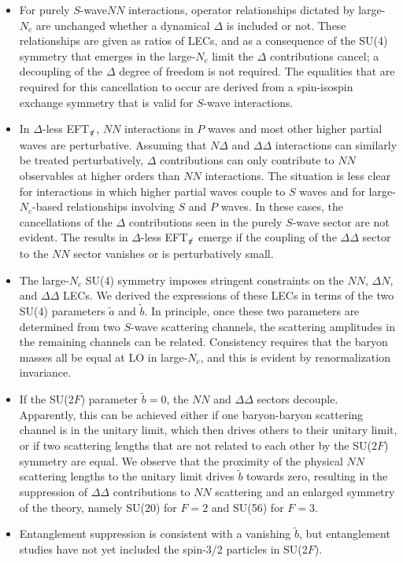 \documentclass[nofootinbib, preprint, aps, prc, superscriptaddress,11pt]{revtex4-1}
\newcommand{\Nc}{\ensuremath{N_c}\xspace}
\newcommand{\NN}{\ensuremath{N\!N}\xspace}
\newcommand\Swave{$S$-wave\xspace}
\newcommand{\1}{\mathbbm{1}}
\newcommand{\at}{\ensuremath{\tilde{a}}\xspace}
\newcommand{\bt}{\ensuremath{\tilde{b}}\xspace}
\newcommand{\nopi}{\ensuremath{\pi\hskip-0.40em /}}
\newcommand{\eftnopi}{EFT$_{\nopi}$\xspace}
\newcommand{\D}{\ensuremath{\Delta}\xspace}
\newcommand{\DD}{\ensuremath{\Delta\Delta}\xspace}
\newcommand{\ND}{\ensuremath{N\!\Delta}\xspace}
\newcommand{\DN}{\ensuremath{\Delta N}\xspace}
\begin{document}
\begin{itemize}

\item For purely \Swave \NN interactions, operator relationships dictated by large-\Nc are unchanged whether a dynamical \D is included or not. 
These relationships are given as ratios of LECs, and as a consequence of the SU(4) symmetry that emerges in the large-\Nc limit the \D contributions cancel; a decoupling of the \D degree of freedom is not required.
The equalities that are required for this cancellation to occur are derived from a spin-isospin exchange symmetry that is valid for \Swave interactions.

\item In \D-less \eftnopi, \NN interactions in $P$ waves and most other higher partial waves are perturbative. 
Assuming that \ND and \DD interactions can similarly be treated perturbatively, \D contributions can only contribute to \NN observables at higher orders than \NN interactions. 
The situation is less clear for interactions in which higher partial waves couple to $S$ waves and for large-\Nc-based relationships involving $S$ and $P$ waves.
In these cases, the cancellations of the \D contributions seen in the purely \Swave sector are not evident. The results in \D-less \eftnopi emerge if the coupling of the \DD sector to the \NN sector vanishes or is perturbatively small.


\item The large-\Nc SU(4) symmetry imposes stringent constraints on the \NN, \DN, and \DD LECs. 
We derived the expressions of these LECs in terms of the two SU(4) parameters \at and \bt.
In principle, once these two parameters are determined from two \Swave scattering channels, the scattering amplitudes in the remaining channels can be related. 
Consistency requires that the baryon masses all be equal at LO in large-\Nc, and this is evident by renormalization invariance.

\item If the SU(2$F$) parameter $\bt=0$, the \NN and \DD sectors decouple. 
Apparently, this can be achieved either if one baryon-baryon scattering channel is in the unitary limit, which then drives others to their unitary limit, or if two scattering lengths that are not related to each other by the SU($2F$) symmetry are equal. 
We observe that the proximity of the physical \NN scattering lengths to the unitary limit drives \bt towards zero, resulting in the suppression of \DD contributions to \NN scattering and an enlarged symmetry of the theory, namely SU(20) for $F=2$ and SU(56) for $F=3$.

\item
Entanglement suppression is consistent with a vanishing \bt, but entanglement studies have not yet included the spin-3/2 particles in SU(2$F$).\footnotemark[\value{footnote}] 

\end{itemize}
\end{document}
